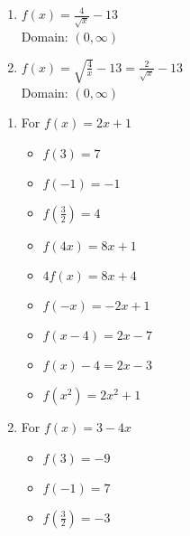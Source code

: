 \begin{multicols}{2}
\begin{enumerate}
\setcounter{enumi}{\value{HW}}

\item $f(x) = \frac{4}{\sqrt{x}} - 13$ \\ Domain: $(0, \infty)$
\item $f(x) = \sqrt{\frac{4}{x}} - 13 = \frac{2}{\sqrt{x}} - 13$ \\ Domain: $(0, \infty)$

\setcounter{HW}{\value{enumi}}
\end{enumerate}
\end{multicols}

\begin{enumerate}
\setcounter{enumi}{\value{HW}}

\item For $f(x) = 2x+1$ 

\begin{multicols}{3}
\begin{itemize}
\item $f(3) = 7$
\item $f(-1) = -1$
\item $f\left(\frac{3}{2} \right) = 4$
\end{itemize}
\end{multicols}

\begin{multicols}{3}
\begin{itemize}
\item  $f(4x) = 8x+1$
\item $4f(x) = 8x+4$
\item $f(-x) = -2x+1$
\end{itemize}
\end{multicols}

\begin{multicols}{3}
\begin{itemize}
\item  $f(x-4) = 2x-7$
\item $f(x) - 4 = 2x-3$
\item  $f\left(x^2\right) = 2x^2+1$
\end{itemize}
\end{multicols}

\item For $f(x) = 3-4x$ 

\begin{multicols}{3}
\begin{itemize}
\item $f(3) = -9$
\item $f(-1) = 7$
\item $f\left(\frac{3}{2} \right) = -3$
\end{itemize}
\end{multicols}


\end{enumerate}

